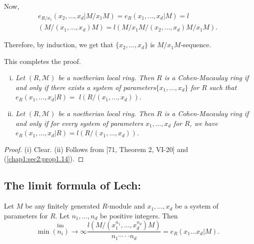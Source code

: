 Now, 
\begin{multline*}
  e_{R/x_1} (x_2, \ldots,  x_d|M/x_1 M)=e_R(x_1, \ldots, x_d|M)=l\\
  (M/(x_1, \ldots,  x_d)M)=l(M/x_1 M/(x_2, \ldots, x_d)M/x_1M).  
\end{multline*}


Therefore, by induction, we get that $\{x_2, \ldots,  x_d\}$ is $M/x_1
M$-seque\-nce.  

This completes the proof. 

\setcounter{corollary}{14}
\begin{corollary}\label{chap1:sec2:coro1.15}
  \begin{enumerate}[(i)]
  \item \textit{Let $(R, \mathscr{M})$ be a noetherian local ring. Then
    $R$ is a Cohen-Macaulay ring if and only if there exists a system of
    parameters\pageoriginale $\{x_1, \ldots,  x_d\}$ for $R$ such that
    $e_R (x_1, \ldots,  x_d |R)=$ \break $l(R/(x_1, \ldots,  x_d))$.} 
  \item \textit {Let $(R, \mathscr{M})$ be a noetherian local ring. Then
    $R$ is a Cohen-Macau\-lay ring if and only if for every system of
    parameters $x_1, \ldots,  x_d$ for $R$, we have $e_R (x_1, \ldots,
    x_d |R)=l(R/(x_1, \ldots,  x_d))$. } 
  \end{enumerate}
\end{corollary}

\begin{proof}
  (i) Clear. (ii) Follows from [71, Theorem 2, VI-20] and
  (\ref{chap1:sec2:prop1.14}).  
\end{proof}

\setcounter{subsection}{15}
\subsection{The limit formula of Lech:}\label{chap1:sec2:subsec1.16} 
Let $M$ be any finitely generated $R$-module and $x_1, \ldots,
  x_d$ be a system of parameters for $R$. Let $n_1, \ldots,  n_d$ be
  positive integers. Then 
$$
\min \overset{\lim}{(n_i)}\to\infty \frac{l (M/(x^{n_1}_1, \ldots,
  x^{n_d}_d)M)}{n_1\cdots\cdot\cdot n_d} =e_R (x_1 \ldots x_d|M). 
$$ 

